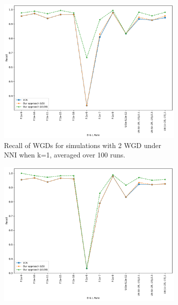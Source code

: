 \documentclass[10pt]{article}
\begin{document}
\begin{figure}[h!]
    \centering
    \begin{subfigure}[b]{0.31\textwidth}
        \centering
        \includegraphics[width=\textwidth]{figs/recall-2W-NNI-K1-WGD-t20-t80-Avg.pdf}
        \caption{Recall of WGDs for simulations with 2 WGD under NNI when k=1, averaged over 100 runs.}
        \label{fig:recall-NNI-k1-2wgd}
    \end{subfigure}
    \hfill
    \begin{subfigure}[b]{0.31\textwidth}
        \centering
        \includegraphics[width=\textwidth]{figs/recall-2W-NNI-K5-WGD-t20-t80-Avg.pdf}

\end{subfigure}
\end{figure}
\end{document}
